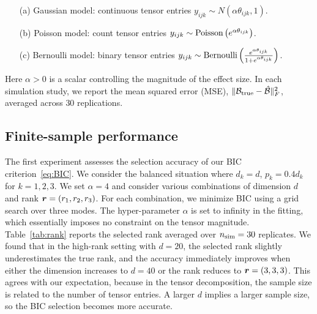 \documentclass[12pt]{article}
\theoremstyle{definition}
\theoremstyle{definition}
\begin{document}
\begin{enumerate}[noitemsep,topsep=0pt]
\item[(a)] Gaussian model: continuous tensor entries $y_{ijk}\sim N\left(\alpha \theta_{ijk}, 1\right)$.
\item[(b)] Poisson model: count tensor entries $y_{ijk}\sim\textup{Poisson}\left( e^{\alpha \theta_{ijk}}\right)$.
\item[(c)] Bernoulli model: binary tensor entries $y_{ijk}\sim \textup{Bernoulli}\left( \frac{e^{\alpha \theta_{ijk}}}{1+e^{\alpha \theta_{ijk}}}\right)$.
\end{enumerate}
Here $\alpha>0$ is a scalar controlling the magnitude of the effect size. In each simulation study, we report the mean squared error (MSE), $\lVert\mathcal{B}_{\textup{true}}-\hat {\mathcal{B}}\rVert_F^2$, averaged across $30$ replications. 

\subsection{Finite-sample performance}
The first experiment assesses the selection accuracy of our BIC criterion~\eqref{eq:BIC}. We consider the balanced situation where $d_k=d$, $p_k=0.4d_k$ for $k=1,2,3$. We set $\alpha=4$ and consider various combinations of dimension $d$ and rank $\bm{r}=(r_1,r_2,r_3)$. For each combination, we minimize BIC using a grid search over three modes. The hyper-parameter $\alpha$ is set to infinity in the fitting, which essentially imposes no constraint on the tensor magnitude. Table~\ref{tab:rank} reports the selected rank averaged over $n_{\textup{sim}}=30$ replicates. We found that in the high-rank setting with $d=20$, the selected rank slightly underestimates the true rank, and the accuracy immediately improves when either the dimension increases to $d = 40$ or the rank reduces to $\bm{r} = (3,3,3)$. This agrees with our expectation, because in the tensor decomposition, the sample size is related to the number of tensor entries. A larger $d$ implies a larger sample size, so the BIC selection becomes more accurate. 
\end{document}
